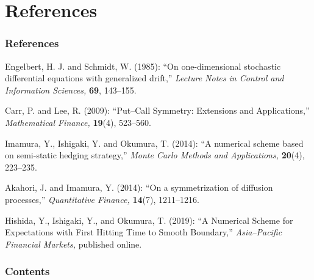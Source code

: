 \documentclass[dvipdfmx,11pt]{beamer}		%
\begin{document}
\section*{References}
%
\begin{frame}\frametitle{References}
	\begin{thebibliography}{9}
	\beamertemplatetextbibitems
		\item Engelbert, H. J. and Schmidt, W. (1985): ``On one-dimensional stochastic differential equations with generalized drift,'' \textit{Lecture Notes in Control and Information Sciences,} \textbf{69}, 143--155.
		\item Carr, P. and Lee, R. (2009): ``Put--Call Symmetry: Extensions and Applications,'' \textit{Mathematical Finance,} \textbf{19}(4), 523--560.
		\item Imamura, Y., Ishigaki, Y. and Okumura, T. (2014): ``A numerical scheme based on semi-static hedging strategy,'' \textit{Monte Carlo Methods and Applications,} \textbf{20}(4), 223--235.
		\item Akahori, J. and Imamura, Y. (2014): ``On a symmetrization of diffusion processes,'' \textit{Quantitative Finance,} \textbf{14}(7), 1211--1216.
		\item Hishida, Y., Ishigaki, Y., and Okumura, T. (2019): ``A Numerical Scheme for Expectations with First Hitting Time to Smooth Boundary,'' \textit{Asia--Pacific Financial Markets,} published online.
	\end{thebibliography}
\end{frame}
%
\begin{frame}\frametitle{Contents}
	\tableofcontents
\end{frame}
%
\end{document}
